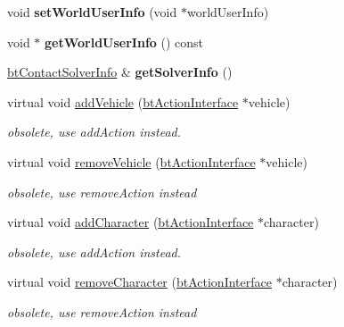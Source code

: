 \begin{DoxyCompactItemize}
\mbox{\label{classbtDynamicsWorld_ad1f3418fce3381a0fbd4419cc701a97d}} 
void {\bfseries set\+World\+User\+Info} (void $\ast$world\+User\+Info)
\item 
\mbox{\label{classbtDynamicsWorld_aeb8cd7e7b8aa9eb61948069fc173e378}} 
void $\ast$ {\bfseries get\+World\+User\+Info} () const
\item 
\mbox{\label{classbtDynamicsWorld_ae8004bb6113c17b9cd1eca5ade1c2aba}} 
\hyperlink{structbtContactSolverInfo}{bt\+Contact\+Solver\+Info} \& {\bfseries get\+Solver\+Info} ()
\item 
\mbox{\label{classbtDynamicsWorld_ab897455739081304249e7af787cafa19}} 
virtual void \hyperlink{classbtDynamicsWorld_ab897455739081304249e7af787cafa19}{add\+Vehicle} (\hyperlink{classbtActionInterface}{bt\+Action\+Interface} $\ast$vehicle)
\begin{DoxyCompactList}\small\item\em obsolete, use add\+Action instead. \end{DoxyCompactList}\item 
\mbox{\label{classbtDynamicsWorld_abb361ed4e22766cd79d22ece3f5869e6}} 
virtual void \hyperlink{classbtDynamicsWorld_abb361ed4e22766cd79d22ece3f5869e6}{remove\+Vehicle} (\hyperlink{classbtActionInterface}{bt\+Action\+Interface} $\ast$vehicle)
\begin{DoxyCompactList}\small\item\em obsolete, use remove\+Action instead \end{DoxyCompactList}\item 
\mbox{\label{classbtDynamicsWorld_a56e16159fdff1311706d4b73e0999e02}} 
virtual void \hyperlink{classbtDynamicsWorld_a56e16159fdff1311706d4b73e0999e02}{add\+Character} (\hyperlink{classbtActionInterface}{bt\+Action\+Interface} $\ast$character)
\begin{DoxyCompactList}\small\item\em obsolete, use add\+Action instead. \end{DoxyCompactList}\item 
\mbox{\label{classbtDynamicsWorld_ae4daeac0b98e39a80bb960c5b995fd2a}} 
virtual void \hyperlink{classbtDynamicsWorld_ae4daeac0b98e39a80bb960c5b995fd2a}{remove\+Character} (\hyperlink{classbtActionInterface}{bt\+Action\+Interface} $\ast$character)
\begin{DoxyCompactList}\small\item\em obsolete, use remove\+Action instead \end{DoxyCompactList}\end{DoxyCompactItemize}
